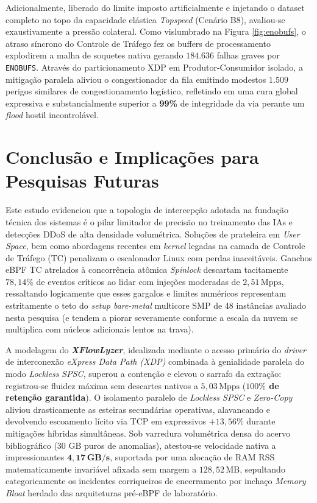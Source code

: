 \documentclass[conference]{IEEEtran}
\newcommand{\nome}{\textit{XFlowLyzer}\xspace}
\begin{document}
Adicionalmente, liberado do limite imposto artificialmente e injetando o dataset completo no topo da capacidade elástica \textit{Topspeed} (Cenário B8), avaliou-se exaustivamente a pressão colateral. Como vislumbrado na Figura \ref{fig:enobufs}, o atraso síncrono do Controle de Tráfego fez os buffers de processamento explodirem a malha de soquetes nativa gerando $\mathbf{184.636}$ falhas graves por \texttt{ENOBUFS}. Através do particionamento XDP em Produtor-Consumidor isolado, a mitigação paralela aliviou o congestionador da fila emitindo modestos $1.509$ perigos similares de congestionamento logístico, refletindo em uma cura global expressiva e substancialmente superior a \textbf{99\%} de integridade da via perante um \textit{flood} hostil incontrolável.

\section{Conclusão e Implicações para Pesquisas Futuras}
Este estudo evidenciou que a topologia de intercepção adotada na fundação técnica dos sistemas é o pilar limitador de precisão no treinamento das IAs e detecções DDoS de alta densidade volumétrica. Soluções de prateleira em \textit{User Space}, bem como abordagens recentes em \textit{kernel} legadas na camada de Controle de Tráfego (TC) penalizam o escalonador Linux com perdas inaceitáveis. Ganchos eBPF TC atrelados à concorrência atômica \textit{Spinlock} descartam tacitamente \textbf{$78,14\%$} de eventos críticos ao lidar com injeções moderadas de $2,51\,\text{Mpps}$, ressaltando logicamente que esses gargalos e limites numéricos representam estritamente o teto do \textit{setup bare-metal} multicore SMP de 48 instâncias avaliado nesta pesquisa (e tendem a piorar severamente conforme a escala da nuvem se multiplica com núcleos adicionais lentos na trava).

A modelagem do \textbf{\nome}, idealizada mediante o acesso primário do \textit{driver} de interconexão \textit{eXpress Data Path (XDP)} combinada à genialidade paralela do modo \textit{Lockless SPSC}, superou a contenção e elevou o sarrafo da extração: registrou-se fluidez máxima sem descartes nativos a \textbf{$5,03\,\text{Mpps}$} (\textbf{$100\%$ de retenção garantida}). O isolamento paralelo de \textit{Lockless SPSC} e \textit{Zero-Copy} aliviou drasticamente as esteiras secundárias operativas, alavancando e devolvendo escoamento lícito via TCP em expressivos \textbf{$+13,56\%$} durante mitigações híbridas simultâneas. Sob varredura volumétrica densa do acervo bibliográfico (30 GB puros de anomalias), atestou-se velocidade nativa a impressionantes $\mathbf{4,17\,\text{GB/s}}$, suportada por uma alocação de RAM RSS matematicamente invariável afixada sem margem a \textbf{$128,52\,\text{MB}$}, sepultando categoricamente os incidentes corriqueiros de encerramento por inchaço \textit{Memory Bloat} herdado das arquiteturas pré-eBPF de laboratório.
\end{document}
